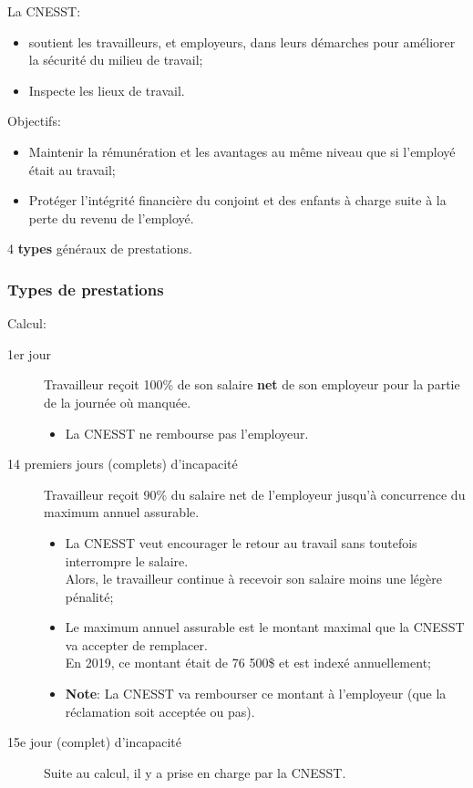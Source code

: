 \documentclass[10pt, french]{article}
\begin{document}
\begin{multicols*}{3}
\begin{definitionNOHFILLsub}[Prévention]
La CNESST:
\begin{itemize}[leftmargin = *]
	\item	soutient les travailleurs, et employeurs, dans leurs démarches pour améliorer la sécurité du milieu de travail;
	\item	Inspecte les lieux de travail.
\end{itemize}
\end{definitionNOHFILLsub}

\begin{definitionNOHFILLsub}[Indemnisation]
Objectifs:
\begin{itemize}[leftmargin = *]
	\item	Maintenir la rémunération et les avantages au même niveau que si l’employé était au travail;
	\item 	Protéger l’intégrité financière du conjoint et des enfants à charge suite à la perte du revenu de l’employé.
\end{itemize}

4 \textbf{types} généraux de prestations.
\end{definitionNOHFILLsub}

\columnbreak
\subsubsection*{Types de prestations}
\begin{definitionNOHFILL}
Calcul:
\begin{description}
	\item[1er jour]	Travailleur reçoit 100\% de son salaire \textbf{net} de son employeur pour la partie de la journée où manquée.
		\begin{itemize}[leftmargin = *]
		\item	La CNESST ne rembourse pas l'employeur.
		\end{itemize}
	\item[14 premiers jours (complets) d'incapacité]	Travailleur reçoit 90\% du salaire net de l'employeur jusqu'à concurrence du maximum annuel assurable.
		\begin{itemize}[leftmargin = *]
		\item	La CNESST veut encourager le retour au travail sans toutefois interrompre le salaire.\\
				Alors, le travailleur continue à recevoir son salaire moins une légère pénalité;
		\item	Le maximum annuel assurable est le montant maximal que la CNESST va accepter de remplacer.\\
				En 2019, ce montant était de 76 500\$ et est indexé annuellement;
		\item	\textbf{Note}: La CNESST va rembourser ce montant à l'employeur (que la réclamation soit acceptée ou pas).
		\end{itemize}
	\item[15e jour (complet) d'incapacité]	Suite au calcul, il y a prise en charge par la CNESST.
\end{description}


\end{definitionNOHFILL}
\end{multicols*}
\end{document}
